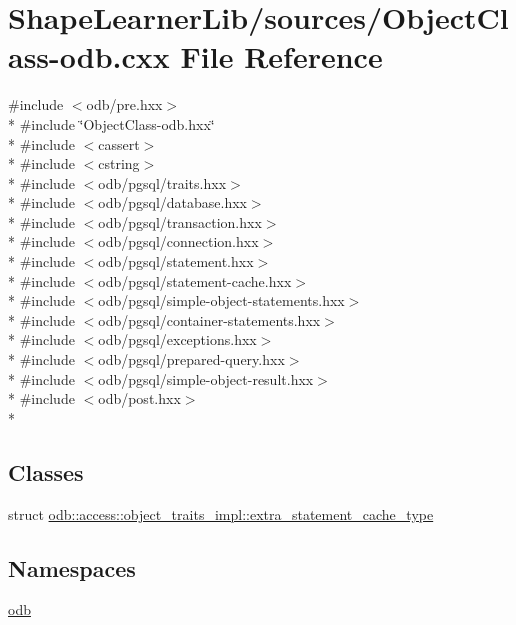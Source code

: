\hypertarget{_object_class-odb_8cxx}{}\section{Shape\+Learner\+Lib/sources/\+Object\+Class-\/odb.cxx File Reference}
\label{_object_class-odb_8cxx}
{\ttfamily \#include $<$odb/pre.\+hxx$>$}\\*
{\ttfamily \#include \char`\"{}Object\+Class-\/odb.\+hxx\char`\"{}}\\*
{\ttfamily \#include $<$cassert$>$}\\*
{\ttfamily \#include $<$cstring$>$}\\*
{\ttfamily \#include $<$odb/pgsql/traits.\+hxx$>$}\\*
{\ttfamily \#include $<$odb/pgsql/database.\+hxx$>$}\\*
{\ttfamily \#include $<$odb/pgsql/transaction.\+hxx$>$}\\*
{\ttfamily \#include $<$odb/pgsql/connection.\+hxx$>$}\\*
{\ttfamily \#include $<$odb/pgsql/statement.\+hxx$>$}\\*
{\ttfamily \#include $<$odb/pgsql/statement-\/cache.\+hxx$>$}\\*
{\ttfamily \#include $<$odb/pgsql/simple-\/object-\/statements.\+hxx$>$}\\*
{\ttfamily \#include $<$odb/pgsql/container-\/statements.\+hxx$>$}\\*
{\ttfamily \#include $<$odb/pgsql/exceptions.\+hxx$>$}\\*
{\ttfamily \#include $<$odb/pgsql/prepared-\/query.\+hxx$>$}\\*
{\ttfamily \#include $<$odb/pgsql/simple-\/object-\/result.\+hxx$>$}\\*
{\ttfamily \#include $<$odb/post.\+hxx$>$}\\*
\subsection*{Classes}
\begin{DoxyCompactItemize}
\item 
struct \hyperlink{structodb_1_1access_1_1object__traits__impl_1_1extra__statement__cache__type}{odb\+::access\+::object\+\_\+traits\+\_\+impl\+::extra\+\_\+statement\+\_\+cache\+\_\+type}
\end{DoxyCompactItemize}
\subsection*{Namespaces}
\begin{DoxyCompactItemize}
\item 
 \hyperlink{namespaceodb}{odb}
\end{DoxyCompactItemize}
